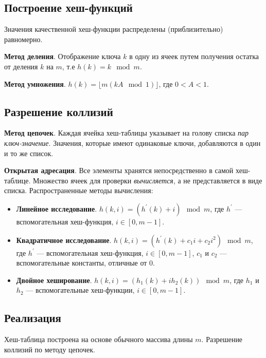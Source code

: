 \subsection{Построение хеш-функций}
Значения качественной хеш-функции распределены (приблизительно) равномерно.

\textbf{Метод деления}. Отображение ключа $k$ в одну из ячеек путем получения остатка от деления $k$ на $m$, т.е $h(k) = k \mod m$.

\textbf{Метод умножения}. $h(k) = \lfloor m (kA \mod 1) \rfloor$, где $0 < A < 1$.

\subsection{Разрешение коллизий}
\textbf{Метод цепочек}. Каждая ячейка хеш-таблицы указывает на голову списка \emph{пар ключ-значение}. Значения, которые имеют одинаковые ключи, добавляются в один и то же список.

\textbf{Открытая адресация}. Все элементы хранятся непосредственно в самой хеш-таблице. Множество ячеек для проверки \emph{вычисляется}, а не представляется в виде списка. Распространенные методы вычисления:
\begin{itemize}
  \item \textbf{Линейное исследование}. $h(k, i) = (h^{'}(k) + i) \mod m$, где $h^{'}$ --- вспомогательная хеш-функция, $i \in [0, m -1 ]$.
  \item \textbf{Квадратичное исследование}. $h(k, i) = (h^{'}(k) + c_1i + c_2i^2) \mod m$, где $h^{'}$ --- вспомогательная хеш-функция, $i \in [0, m -1 ]$, $c_1$ и $c_2$ --- вспомогательные константы, отличные от $0$.
  \item \textbf{Двойное хеширование}. $h(k, i) = (h_1(k) + ih_2(k)) \mod m$, где $h_1$ и $h_2$ --- вспомогательные хеш-функции, $i \in [0, m -1 ]$.
\end{itemize}

\subsection{Реализация}
Хеш-таблица построена на основе обычного массива длины $m$. Разрешение коллизий по методу цепочек.

